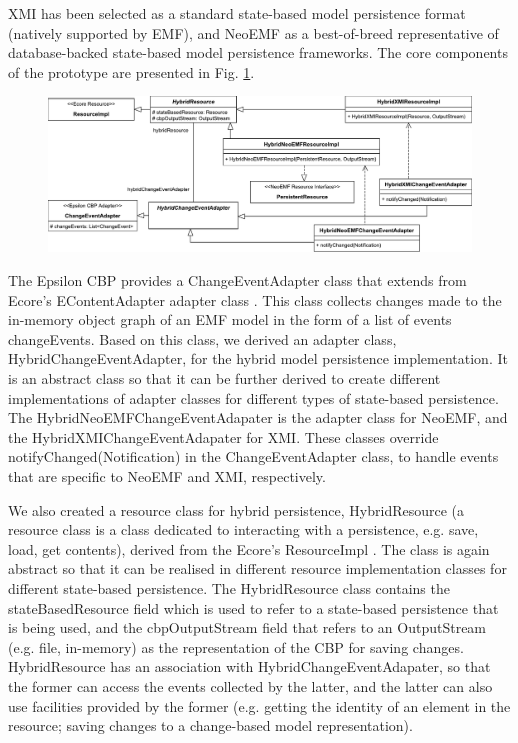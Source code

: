\documentclass{llncs}
\begin{document}
XMI has been selected as a standard state-based model persistence format (natively supported by EMF), and NeoEMF as a best-of-breed representative of database-backed state-based model persistence frameworks. The core components of the prototype are presented in Fig. \ref{fig:class_diagram}. 

\vspace{-15pt}
\begin{figure}[ht]
    \includegraphics[width=\linewidth]{images/class_diagram}
    \label{fig:class_diagram}
\end{figure}

\vspace{-15pt}
The Epsilon CBP provides a \textsf{ChangeEventAdapter} class \cite{DBLP:conf/models/YohannisKP17} that extends from Ecore's \textsf{EContentAdapter} adapter class%
. This class collects changes made to the in-memory object graph of an EMF model in the form of a list of events \textsf{changeEvents}. Based on this class, we derived an adapter class, \textsf{HybridChangeEventAdapter}, for the hybrid model persistence implementation. It is an abstract class so that it can be further derived to create different implementations of adapter classes for different types of state-based persistence. The \textsf{HybridNeoEMFChangeEventAdapater} is the adapter class for NeoEMF, and the \textsf{HybridXMIChangeEventAdapater} for XMI. These classes override \textsf{notifyChanged}(\textsf{Notification}) in the \textsf{ChangeEventAdapter} class, to handle events that are specific to NeoEMF and XMI, respectively.

We also created a resource class for hybrid persistence, \textsf{HybridResource} (a resource class is a class dedicated to interacting with a persistence, e.g. save, load, get contents), derived from the Ecore's \textsf{ResourceImpl}%
. The class is again abstract so that it can be realised in different resource implementation classes for different state-based persistence. The \textsf{HybridResource} class contains the \textsf{stateBasedResource} field which is used to refer to a state-based persistence that is being used, and the \textsf{cbpOutputStream} field that refers to an \textsf{OutputStream} (e.g. file, in-memory) as the representation of the CBP for saving changes. \textsf{HybridResource} has an association with \textsf{HybridChangeEventAdapater}, so that the former can access the events collected by the latter, and the latter can also use facilities provided by the former (e.g. getting the identity of an element in the resource; saving changes to a change-based model representation).
\end{document}
